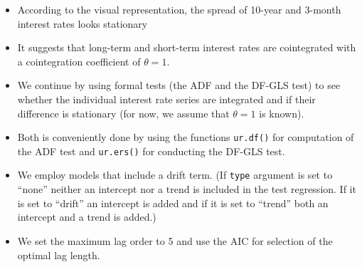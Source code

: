 \documentclass[]{book}
\newenvironment{Shaded}{\begin{snugshade}}{\end{snugshade}}
\newcommand{\CommentTok}[1]{\textcolor[rgb]{0.56,0.35,0.01}{\textit{#1}}}
\newcommand{\DataTypeTok}[1]{\textcolor[rgb]{0.13,0.29,0.53}{#1}}
\newcommand{\DecValTok}[1]{\textcolor[rgb]{0.00,0.00,0.81}{#1}}
\newcommand{\KeywordTok}[1]{\textcolor[rgb]{0.13,0.29,0.53}{\textbf{#1}}}
\newcommand{\NormalTok}[1]{#1}
\newcommand{\OperatorTok}[1]{\textcolor[rgb]{0.81,0.36,0.00}{\textbf{#1}}}
\newcommand{\StringTok}[1]{\textcolor[rgb]{0.31,0.60,0.02}{#1}}
\begin{document}
\begin{itemize}
\item
  According to the visual representation, the spread of 10-year and 3-month interest rates looks stationary
\item
  It suggests that long-term and short-term interest rates are cointegrated with a cointegration coefficient of \(\theta = 1.\)
\item
  We continue by using formal tests (the ADF and the DF-GLS test) to see whether the individual interest rate series are integrated and if their difference is stationary (for now, we assume that \(\theta = 1\) is known).
\item
  Both is conveniently done by using the functions \texttt{ur.df()} for computation of the ADF test and \texttt{ur.ers()} for conducting the DF-GLS test.
\item
  We employ models that include a drift term. (If \texttt{type} argument is set to ``none'' neither an intercept nor a trend is included in the test regression. If it is set to ``drift'' an intercept is added and if it is set to ``trend'' both an intercept and a trend is added.)
\item
  We set the maximum lag order to 5
  and use the AIC for selection of the optimal lag length.
\end{itemize}

\begin{Shaded}
\end{Shaded}
\end{document}
